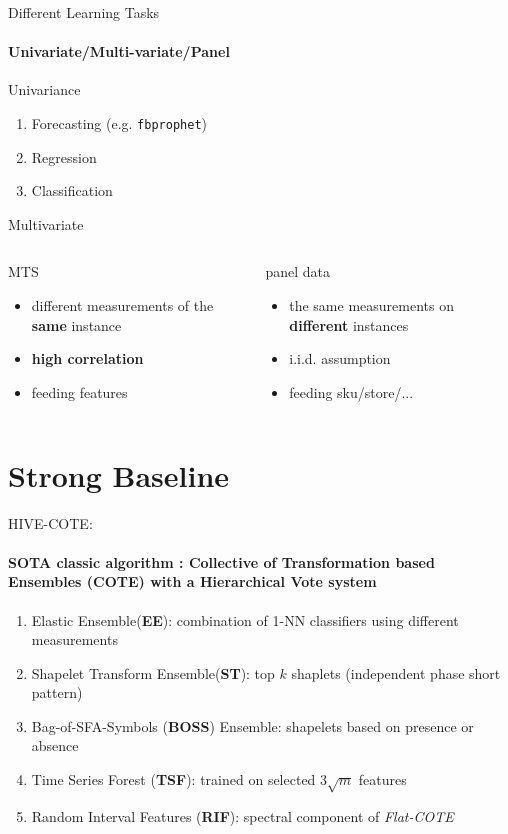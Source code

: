 \documentclass[aspectratio=169]{ctexbeamer}
\begin{document}
\begin{frame}{Different Learning Tasks}
	\framesubtitle{Univariate/Multi-variate/Panel}
	Univariance
	\begin{enumerate}
		\item Forecasting (e.g. \texttt{fbprophet})
		\item Regression
		\item Classification
	\end{enumerate}
	Multivariate
	\begin{columns}

		\begin{block}{MTS}
			\begin{itemize}
				\item different measurements of the \textbf{same} instance
				\item \textbf{high correlation}
				\item feeding features
			\end{itemize}
		\end{block}

		\begin{block}{panel data}
			\begin{itemize}
				\item the same measurements on \textbf{different} instances
				\item i.i.d. assumption
				\item feeding sku/store/...
			\end{itemize}
		\end{block}
	\end{columns}
\end{frame}



\section{Strong Baseline}
\begin{frame}{HIVE-COTE:}
	\framesubtitle{\textbf{SOTA} classic algorithm : Collective of Transformation based \textbf{Ensembles} (COTE) with a Hierarchical Vote system}
	\begin{enumerate}
		\item Elastic Ensemble(\textbf{EE}): combination of 1-NN classifiers using different measurements
		\item Shapelet Transform Ensemble(\textbf{ST}): top $k$ shaplets (independent phase short pattern)
		\item Bag-of-SFA-Symbols (\textbf{BOSS}) Ensemble: shapelets based on presence or absence
		\item Time Series Forest (\textbf{TSF}): trained on selected $3 \sqrt{m}$ features
		\item Random Interval Features (\textbf{RIF}): spectral component of \textit{Flat-COTE}
	\end{enumerate}
\end{frame}
\end{document}
